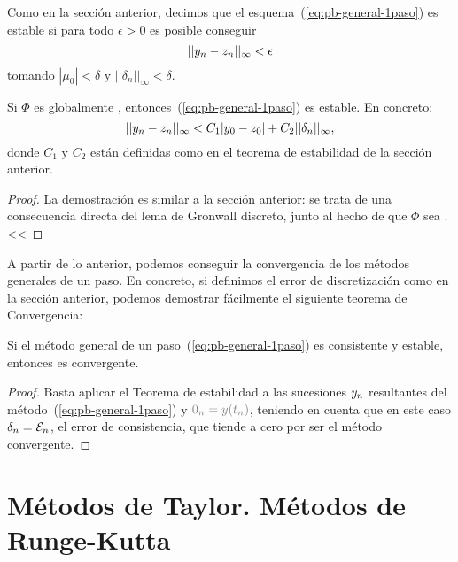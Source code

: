 Como en la sección anterior, decimos que el esquema~(\ref{eq:pb-general-1paso})
es estable si para todo $\epsilon>0$ es posible conseguir
$$
||{y_n} - z_n||_\infty < \epsilon
$$
tomando $|\mu_0|<\delta$ y $||\delta_n||_\infty<\delta$.

\begin{theorem}
  Si $\Phi$ es globalmente \lipschitz,
  entonces~(\ref{eq:pb-general-1paso}) es estable. En concreto:
  $$
  ||{y_n} - z_n||_\infty < C_1|y_0-z_0| + C_2 ||\delta_n||_\infty,
  $$
  donde $C_1$ y $C_2$ están definidas como en el teorema de
  estabilidad de la sección anterior.
\end{theorem}
\begin{proof}
  La demostración es similar a la sección anterior: se trata de una
  consecuencia directa del lema de Gronwall discreto, junto al hecho
  de que $\Phi$ sea \lipschitz.<<
\end{proof}
A partir de lo anterior, podemos conseguir la convergencia de los
métodos generales de un paso. En concreto, si definimos el error de
discretización como en la sección anterior, podemos demostrar
fácilmente el siguiente teorema de Convergencia:

\begin{theorem}
  Si el método general de un paso~(\ref{eq:pb-general-1paso}) es
  consistente y estable, entonces es convergente.
\end{theorem}

\begin{proof}
  Basta aplicar el Teorema de estabilidad a las sucesiones ${y_n}$
  resultantes del método~(\ref{eq:pb-general-1paso}) y $\z_n=y(\tn)$,
  teniendo en cuenta que en este caso $\delta_n={\cal E}_n$, el error
  de consistencia, que tiende a cero por ser el método convergente.
\end{proof}

\section{Métodos de Taylor. Métodos de Runge-Kutta}

